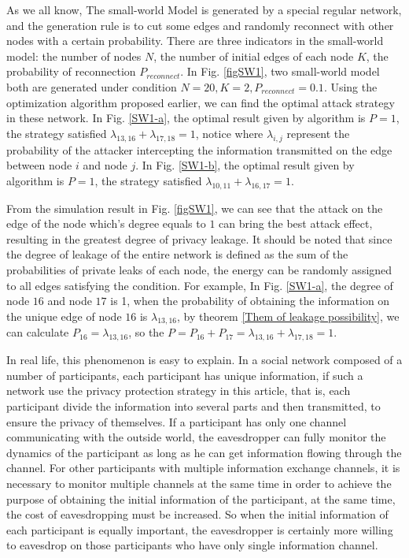 \documentclass[10pt,journal,compsoc]{IEEEtran}
\begin{document}
As we all know, The small-world Model is generated by a special regular network, and the generation rule is to cut some edges and randomly reconnect with other nodes with a certain probability. There are three indicators in the small-world model: the number of nodes $N$, the number of initial edges of each node $K$, the probability of reconnection $P_{reconnect}$. In Fig. \ref{figSW1}, two small-world model both are generated under condition $N=20,K=2,P_{reconnect}=0.1$. Using the optimization algorithm proposed earlier, we can find the optimal attack strategy in these network. In Fig. \ref{SW1-a}, the optimal result given by algorithm is $P=1$, the strategy satisfied $\lambda_{13,16}+\lambda_{17,18}=1$, notice where $\lambda_{i, j}$ represent the probability of the attacker intercepting the information transmitted on the edge between node $i$ and node $j$. In Fig. \ref{SW1-b}, the optimal result given by algorithm is $P=1$, the strategy satisfied $\lambda_{10,11}+\lambda_{16,17}=1$.

From the simulation result in Fig. \ref{figSW1}, we can see that the attack on the edge of the node which's degree equals to $1$ can bring the best attack effect, resulting in the greatest degree of privacy leakage. It should be noted that since the degree of leakage of the entire network is defined as the sum of the probabilities of private leaks of each node, the energy can be randomly assigned to all edges satisfying the condition. For example, In Fig. \ref{SW1-a}, the degree of node $16$ and node $17$ is 1, when the probability of obtaining the information on the unique edge of node $16$ is $\lambda_{13,16}$, by theorem \ref{Them of leakage possibility}, we can calculate $P_{16}=\lambda_{13,16}$, so the $P=P_{16}+P_{17}=\lambda_{13,16}+\lambda_{17,18}=1$.

 In real life, this phenomenon is easy to explain. In a social network composed of a number of participants, each participant has unique information, if such a network use the privacy protection strategy in this article, that is, each participant divide the information into several parts and then transmitted, to ensure the privacy of themselves. If a participant has only one channel communicating with the outside world, the eavesdropper can fully monitor the dynamics of the participant as long as he can get information flowing through the channel. For other participants with multiple information exchange channels, it is necessary to monitor multiple channels at the same time in order to achieve the purpose of obtaining the  initial information of the participant, at the same time, the cost of eavesdropping must be increased. So when the initial information of each participant is equally important, the eavesdropper is certainly more willing to eavesdrop on those participants who have only single information channel.
\end{document}
